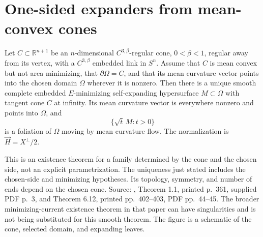 \chapter{One-sided expanders from mean-convex cones}\label{sec:catalogue-mean-convex-expanders}
\begin{example}\label{ex:catalogue-mean-convex-expanders}
Let $C\subset\mathbb R^{n+1}$ be an $n$-dimensional $C^{3,\beta}$-regular cone, $0<\beta<1$, regular away from its vertex, with a $C^{3,\beta}$ embedded link in $S^n$. Assume that $C$ is mean convex but not area minimizing, that $\partial\Omega=C$, and that its mean curvature vector points into the chosen domain $\Omega$ wherever it is nonzero. Then there is a unique smooth complete embedded $E$-minimizing self-expanding hypersurface $M\subset\Omega$ with tangent cone $C$ at infinity. Its mean curvature vector is everywhere nonzero and points into $\Omega$, and
\[
 \{\sqrt t\,M:t>0\}
\]
is a foliation of $\Omega$ moving by mean curvature flow. The normalization is $\vec H=X^\perp/2$.

This is an existence theorem for a family determined by the cone and the chosen side, not an explicit parametrization. The uniqueness just stated includes the chosen-side and minimizing hypotheses. Its topology, symmetry, and number of ends depend on the chosen cone. Source: \cite{CatDing20}, Theorem 1.1, printed p.~361, supplied PDF p.~3, and Theorem 6.12, printed pp.~402--403, PDF pp.~44--45. The broader minimizing-current existence theorem in that paper can have singularities and is not being substituted for this smooth theorem. The figure is a schematic of the cone, selected domain, and expanding leaves.
\end{example}

